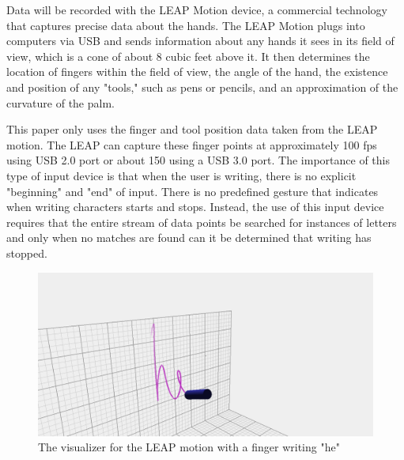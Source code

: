 Data will be recorded with the LEAP Motion device, a commercial technology that captures precise data about the hands.
The LEAP Motion plugs into computers via USB and sends information about any hands it sees in its field of view, which is a cone of about 8 cubic feet above it.
It then determines the location of fingers within the field of view, the angle of the hand, the existence and position of any "tools," such as pens or pencils, and an approximation of the curvature of the palm.

This paper only uses the finger  and tool position data taken from the LEAP motion. The LEAP can capture these finger points at approximately 100 fps using USB 2.0 port or about 150 using a USB 3.0 port.
The importance of this type of input device is that when the user is writing, there is no explicit "beginning" and "end" of input. There is no predefined gesture that indicates when writing characters starts and stops. Instead, the use of this input device requires that the entire stream of data points be searched for instances of letters and only when no matches are found can it be determined that writing has stopped.
\begin{figure}
  \begin{center}
  \includegraphics[width=\columnwidth]{images/he-white.PNG}
  \caption{The visualizer for the LEAP motion with a finger writing "he"}
  \label{fig:teaser}
  \end{center}  
\end{figure}
